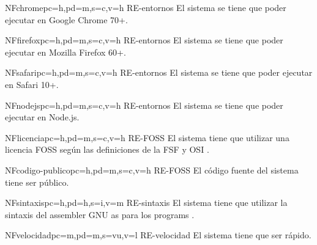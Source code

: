\begin{softwareReq}{NF}{chrome}{pc=h,pd=m,s=c,v=h}
    {RE-entornos}
    El sistema se tiene que poder ejecutar en Google Chrome 70+.
\end{softwareReq}

\begin{softwareReq}{NF}{firefox}{pc=h,pd=m,s=c,v=h}
    {RE-entornos}
    El sistema se tiene que poder ejecutar en Mozilla Firefox 60+.
\end{softwareReq}

\begin{softwareReq}{NF}{safari}{pc=h,pd=m,s=c,v=h}
    {RE-entornos}
    El sistema se tiene que poder ejecutar en Safari 10+.
\end{softwareReq}

\begin{softwareReq}{NF}{nodejs}{pc=h,pd=m,s=c,v=h}
    {RE-entornos}
    El sistema se tiene que poder ejecutar en Node.js.
\end{softwareReq}

\begin{softwareReq}{NF}{licencia}{pc=h,pd=m,s=c,v=h}
    {RE-FOSS}
    El sistema tiene que utilizar una licencia \gls{FOSS} según las definiciones
    de la \gls{FSF} \parencite{FreeSoftware} y \gls{OSI} \parencite{OpenSource}.
\end{softwareReq}

\begin{softwareReq}{NF}{codigo-publico}{pc=h,pd=m,s=c,v=h}
    {RE-FOSS}
    El código fuente del sistema tiene ser público.
\end{softwareReq}

\begin{softwareReq}{NF}{sintaxis}{pc=h,pd=h,s=i,v=m}
    {RE-sintaxis}
    El sistema tiene que utilizar la sintaxis del \gls{assembler} GNU as
    \parencite{as-manual} para los \glspl{program} .
\end{softwareReq}

\begin{softwareReq}{NF}{velocidad}{pc=m,pd=m,s=vu,v=l}
    {RE-velocidad}
    El sistema tiene que ser rápido. %
\end{softwareReq}

\FloatBarrier


